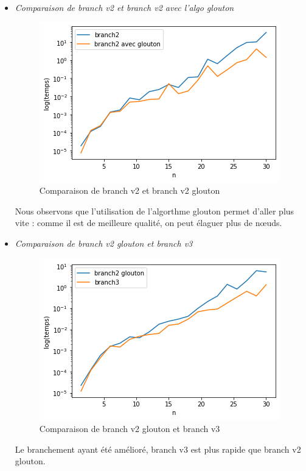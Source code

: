 \documentclass[12pt]{article}
\begin{document}
\begin{itemize}
            \item \textit{Comparaison de branch v2 et branch v2 avec l'algo glouton} \\
                \begin{figure}[h]
                    \caption{Comparaison de branch v2 et branch v2 glouton}
                    \includegraphics[scale=0.6]{figures/branch2-2glou.png}
                    \centering
                \end{figure}
                Nous observons que l'utilisation de l'algorthme glouton permet d'aller plus vite : comme il est de meilleure qualité, on peut élaguer plus de nœuds.

            \item \textit{Comparaison de branch v2 glouton et branch v3} \\
            \begin{figure}[h]
                \caption{Comparaison de branch v2 glouton et branch v3}
                \includegraphics[scale=0.6]{figures/branch2glou-3.png}
                \centering
            \end{figure}
            Le branchement ayant été amélioré, branch v3 est plus rapide que branch v2 glouton.


\end{itemize}
\end{document}
